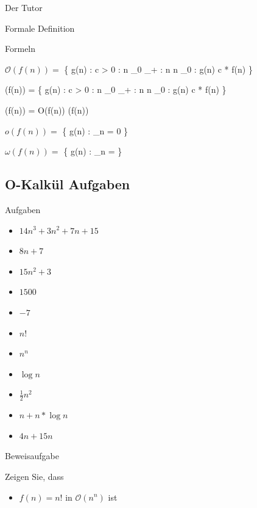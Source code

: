 \documentclass[18pt]{beamer}
\begin{document}
\begin{frame}{Der Tutor}
	\begin{frame}{Formale Definition}
				
		\begin{block} {Formeln}	
				\item $\mathcal{O}(f(n)) = $ \{ g(n) : \exists c >  0 : \exists  n _{0} \in {} _{+} : \all n \geq n _{0} : g(n) \leq c * f(n) \} \\
				\item \Omega(f(n)) = \{ g(n) : \exists c >  0 : \exists  n _{0} \in {} _{+} : \all n \geq n _{0} : g(n) \leq c * f(n) \}\\

				\item \Theta(f(n)) = O(f(n))   \cap   \Omega(f(n))
			
				\item $o(f(n)) = $ \{ g(n) : \lim _{n \to \infty}  = 0 \}

				\item $\omega(f(n)) = $ \{ g(n) : \lim _{n \to \infty}  = \infty \}

							
		\end{block}	

	\end{frame}
	\subsection{O-Kalkül Aufgaben}

	\begin{frame}{Aufgaben}
		\begin{itemize}
			\item $ 14 n ^{3} + 3 n ^{2}  + 7n + 15$
			\item $ 8 n + 7 $
			\item $ 15 n ^{2} + 3 $
			\item $ 1500 $
			\item $ -7 $
			\item $ n! $
			\item $ n ^{n} $
			\item $ \log{n} $
			\item $ \frac{1}{2} n ^{2} $
			\item $ n + n * \log{n} $
			\item $ 4 n + 15 n $	
		\end{itemize}	
	\end{frame}

	\begin{frame}{Beweisaufgabe}
		\begin{exampleblock}{Zeigen Sie, dass}
			\begin{itemize}
				\item $ f(n) =  n! $ in $ \mathcal{O} ( n ^{n}) $ ist
			\end{itemize}
		\end{exampleblock}
	\end{frame}



\end{frame}
\end{document}
